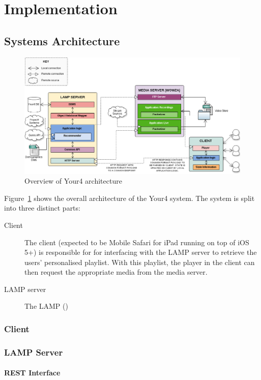 \section{Implementation}

\subsection{Systems Architecture}

\begin{figure}[H]
	\centering
	\includegraphics[scale=0.4]{images/your4-architecture.png}
	\caption{Overview of Your4 architecture}
	\label{your4-architecture}
\end{figure}

Figure~\ref{your4-architecture} shows the overall architecture of the Your4 system. The system is split into three distinct parts:

\begin{description}
	\item[Client] The client (expected to be Mobile Safari for iPad running on top of iOS 5+) is responsible for for interfacing with the LAMP server to retrieve the users' personalised playlist. With this playlist, the player in the client can then request the appropriate media from the media server.
	\item[LAMP server] The LAMP ()
\end{description}

\subsubsection{Client}
\subsubsection{LAMP Server}
\paragraph{REST Interface}
